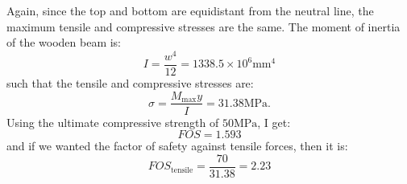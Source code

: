 \documentclass{article}
\begin{document}
Again, since the top and bottom are equidistant from the neutral line, the maximum tensile and compressive stresses are the same. The moment of inertia of the wooden beam is:
\begin{equation}
    I = \frac{w^4}{12} = 1338.5 \times 10^{6} \si{\milli\meter\tothe{4}}
    \label{eq:}
\end{equation}
such that the tensile and compressive stresses are:
\begin{equation}
    \sigma = \frac{M_\text{max}y}{I} = 31.38 \si{\mega\pascal}.
    \label{eq:}
\end{equation}
Using the ultimate compressive strength of $50\si{\mega\pascal}$, I get:
\begin{equation}
    FOS = 1.593
    \label{eq:}
\end{equation}
and if we wanted the factor of safety against tensile forces, then it is:
\begin{equation}
    FOS_\text{tensile} = \frac{70}{31.38} = 2.23
    \label{eq:}
\end{equation}
\newpage
\end{document}
